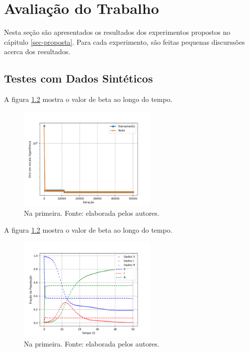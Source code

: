 \chapter{Avaliação do Trabalho}
\label{sec-avaliacao}

Nesta seção são apresentados os resultados dos experimentos propostos no 
cápitulo \ref{sec-proposta}. Para cada experimento, são feitas pequenas discurssões
acerca dos resultados.

\section{Testes com Dados Sintéticos}

A figura \ref{fig:compartimentos-sir-semruido} mostra o valor de 
beta ao longo do tempo.

\begin{figure}[htpb]
\centering
\includegraphics[width=0.6\textwidth]{figuras/loss-sir-nonoise.png}
\caption{Na primeira. Fonte: elaborada pelos autores.}
\label{fig:loss-sir-semruido}
\end{figure}


A figura \ref{fig:compartimentos-sir-semruido} mostra o valor de 
beta ao longo do tempo.

\begin{figure}[htpb]
\centering
\includegraphics[width=0.6\textwidth]{figuras/predicted-compartments-sir-nonoise.png}
\caption{Na primeira. Fonte: elaborada pelos autores.}
\label{fig:compartimentos-sir-semruido}
\end{figure}

